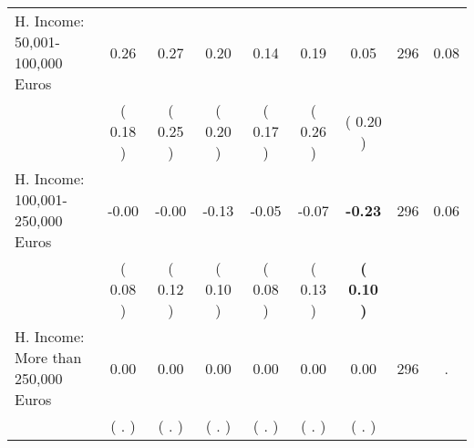 \begin{tabular}{lcccccccc}
H. Income: 50,001-100,000 Euros &      0.26 &      0.27 &      0.20 &      0.14 &      0.19 &      0.05 & 296 &       0.08 \\ 
 & (     0.18 ) & (     0.25 ) & (     0.20 ) & (     0.17 ) & (     0.26 ) & (     0.20 ) & \\
H. Income: 100,001-250,000 Euros &     -0.00 &     -0.00 &     -0.13 &     -0.05 &     -0.07 & \textbf{    -0.23} & 296 &       0.06 \\ 
 & (     0.08 ) & (     0.12 ) & (     0.10 ) & (     0.08 ) & (     0.13 ) & \textbf{(     0.10 )} & \\
H. Income: More than 250,000 Euros &      0.00 &      0.00 &      0.00 &      0.00 &      0.00 &      0.00 & 296 &          . \\ 
 & (        . ) & (        . ) & (        . ) & (        . ) & (        . ) & (        . ) & \\
\bottomrule
\end{tabular}
